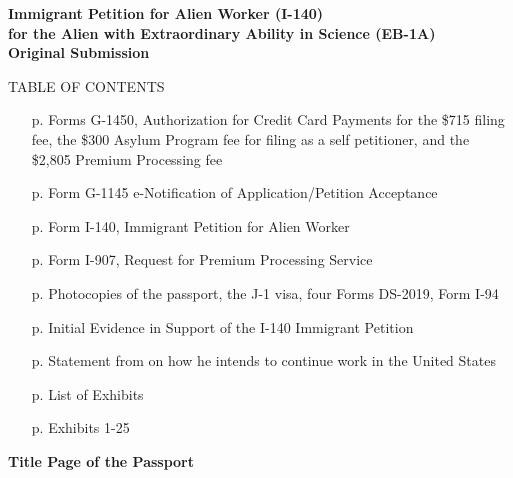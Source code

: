 \vspace*{\fill}
\begin{center}
	
	{\bf
		Immigrant Petition for Alien Worker (I-140)\\
		for the Alien with Extraordinary Ability in Science (EB-1A)\\
		Original Submission
	}
	
\end{center}
\vspace*{\fill}


\begin{center}
TABLE OF CONTENTS
\end{center}
\begin{itemize}
	\item [p. \pageref*{G-1450}] Forms G-1450, Authorization for Credit Card
	Payments for the \$715 filing fee, the \$300 Asylum Program fee for filing 
	as a self petitioner, and the \$2,805 Premium Processing fee
    \item [p. \pageref*{G-1145}] Form G-1145 e-Notification of 
    Application/Petition Acceptance
   \item [p. \pageref*{I-140}] Form I-140, Immigrant Petition for Alien Worker
   \item [p. \pageref*{I-907}] Form I-907, Request for Premium Processing 
   Service
   \item [p. \pageref*{docs}] Photocopies of the passport, the J-1 visa, four
   Forms DS-2019, Form I-94
   \item [p. \pageref*{IE}] Initial Evidence in Support of the I-140 Immigrant 
   Petition
   \item [p. \pageref*{plans}] Statement from \drfull on how he intends to continue work in the United States
   \item [p. \pageref*{list-exhibits}] List of Exhibits
   \item [p. \pageref*{exhibits}] Exhibits 1-25
\end{itemize}

\pagebreak

\label{G-1450}

\label{G-1145}

\label{I-140}

\label{I-907}

\vspace*{\fill}
\begin{center}
	
	{\LARGE \bf
		Title Page of the Passport
	}
	\label{docs}
\end{center}
\vspace*{\fill}
\newpage

